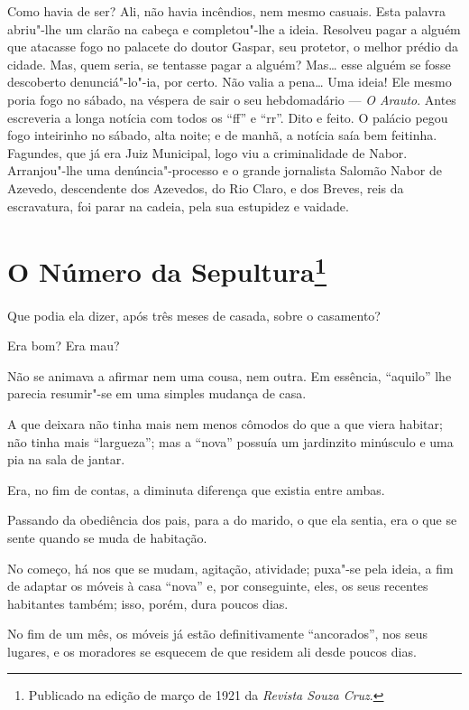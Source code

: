 Como havia de ser? Ali, não havia incêndios, nem mesmo casuais. Esta
palavra abriu"-lhe um clarão na cabeça e completou"-lhe a ideia. Resolveu
pagar a alguém que atacasse fogo no palacete do doutor Gaspar, seu
protetor, o melhor prédio da cidade. Mas, quem seria, se tentasse pagar
a alguém? Mas\ldots{} esse alguém se fosse descoberto denunciá"-lo"-ia,
por certo. Não valia a pena\ldots{} Uma ideia! Ele mesmo poria fogo no
sábado, na véspera de sair o seu hebdomadário --- \emph{O Arauto}. Antes
escreveria a longa notícia com todos os ``ff'' e ``rr''. Dito e feito. O
palácio pegou fogo inteirinho no sábado, alta noite; e de manhã, a
notícia saía bem feitinha. Fagundes, que já era Juiz Municipal, logo viu
a criminalidade de Nabor. Arranjou"-lhe uma denúncia"-processo e o grande
jornalista Salomão Nabor de Azevedo, descendente dos Azevedos, do Rio
Claro, e dos Breves, reis da escravatura, foi parar na cadeia, pela sua
estupidez e vaidade.



\chapter[O Número da Sepultura]{O Número da Sepultura\footnote[*]{Publicado na edição de março de 1921 da \emph{Revista Souza Cruz}.}}

Que podia ela dizer, após três meses de casada, sobre o casamento?

Era bom? Era mau?

Não se animava a afirmar nem uma cousa, nem outra. Em essência,
``aquilo'' lhe parecia resumir"-se em uma simples mudança de casa.

A que deixara não tinha mais nem menos cômodos do que a que viera
habitar; não tinha mais ``largueza''; mas a ``nova'' possuía um
jardinzito minúsculo e uma pia na sala de jantar.

Era, no fim de contas, a diminuta diferença que existia entre ambas.

Passando da obediência dos pais, para a do marido, o que ela sentia, era
o que se sente quando se muda de habitação.

No começo, há nos que se mudam, agitação, atividade; puxa"-se pela ideia,
a fim de adaptar os móveis à casa ``nova'' e, por conseguinte, eles, os
seus recentes habitantes também; isso, porém, dura poucos dias.

No fim de um mês, os móveis já estão definitivamente ``ancorados'', nos
seus lugares, e os moradores se esquecem de que residem ali desde poucos
dias.

